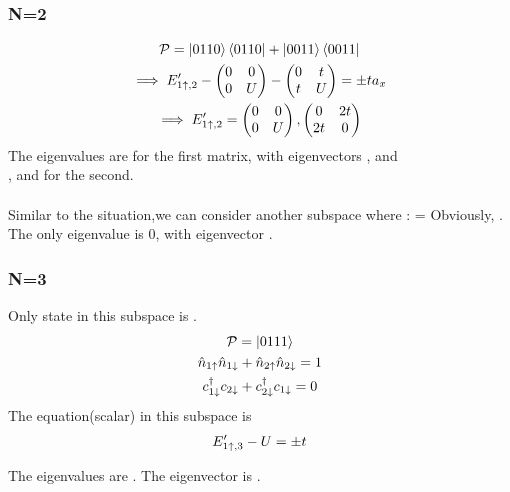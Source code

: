 \documentclass[12pt]{article}
\begin{document}
\subsubsection{N=2}
\begin{gather}
        \mathcal{P} = \ket{0110}\bra{0110}+\ket{0011}\bra{0011} \\
        \implies E^\prime_{1\uparrow,2}-\begin{pmatrix} 0 & 0 \\ 0 & U \end{pmatrix} - \begin{pmatrix} 0 & t \\ t & U \end{pmatrix} = \pm t a_x \\
                \implies E^\prime_{1\uparrow,2} = \begin{pmatrix} 0 & 0 \\ 0 & U \end{pmatrix}, \begin{pmatrix} 0 & 2t \\ 2t & 0 \end{pmatrix}
\end{gather}
The eigenvalues are  for the first matrix, with eigenvectors , and\\  ,  and  for the second.\\\\
Similar to the  situation,we can consider another subspace where :
\beq
{} = 
\eeq
Obviously, . The only eigenvalue is 0, with eigenvector \il{\ket{\da,\da}}.


\subsubsection{N=3}
Only state in this subspace is .
\begin{gather}
    \mathcal{P} = \ket{0111} \\
    \hat n_{1\uparrow}\hat n_{1\downarrow}+\hat n_{2\uparrow}\hat n_{2\downarrow} = 1 \\
    c_{1\downarrow}^\dagger c_{2\downarrow}+c_{2\downarrow}^\dagger c_{1\downarrow} = 0
\end{gather}
The equation(scalar) in this subspace is 
\begin{gather}
    E^\prime_{1\uparrow,3}-U = \pm t\label{yeah}
\end{gather}

The eigenvalues are . The eigenvector is .
\end{document}
